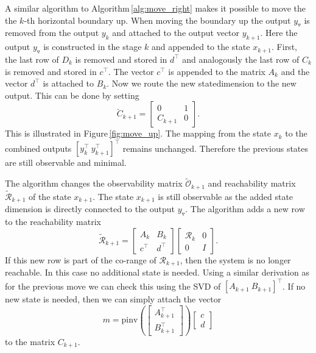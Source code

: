 \documentclass[numbers=noenddot,doctype=mastersthesis,BCOR=15mm,biblatex]{ldvbook}%
\newcommand{\R}{\mathcal{R}} %
\newcommand{\Ob}{\mathcal{O}} %
\newcommand{\eye}{I} %
\newcommand{\m}{\triangledown} %
\begin{document}
A similar algorithm to Algorithm\,\ref{alg:move_right} makes it possible to move the the $k$-th horizontal boundary up.
When moving the boundary up the output $y_\m$ is removed from the output $y_k$ and attached to the output vector $y_{k+1}$.
Here the output $y_\m$ is constructed in the stage $k$ and appended to the state $x_{k+1}$.
First, the last row of $D_{k}$ is removed and stored in $d^\top$ and analogously the last row of $C_k$ is removed and stored in $c^\top$.
The vector $c^\top$ is appended to the matrix $A_k$ and the vector $d^\top$ is attached to $B_k$.
Now we route the new statedimension to the new output.
This can be done by setting 
\begin{equation}
\breve{C}_{k+1} = 
\begin{bmatrix}
0 & 1\\ C_{k+1} & 0
\end{bmatrix}
.
\end{equation}
This is illustrated in Figure\,\ref{fig:move_up}.
The mapping from the state $x_k$ to the combined outputs $[y_k^\top \: y_{k+1}^\top]^\top$ remains unchanged. Therefore the previous states are still observable and minimal.

The algorithm changes the observability matrix $\tilde{\Ob}_{k+1}$ and reachability matrix $\tilde{\R}_{k+1}$ of the state $x_{k+1}$.
The state $x_{k+1}$ is still observable as the added state dimension is directly connected to the output $y_\m$.
The algorithm adds a new row to the reachability matrix
\begin{equation}
\tilde{\R}_{k+1}
=
\begin{bmatrix}
A_{k} & B_{k}\\
c^\top & d^\top
\end{bmatrix}
\begin{bmatrix}
\R_{k} &0\\
0& \eye
\end{bmatrix}
.
\end{equation}
If this new row is part of the co-range of $\R_{k+1}$, then the system is no longer reachable.
In this case no additional state is needed. 
Using a similar derivation as for the previous move we can check this using the SVD of $[A_{k+1} \: B_{k+1}]^\top$.
If no new state is needed, then we can simply attach the vector
\begin{equation}
m = \text{pinv}\left(\begin{bmatrix}
A_{k+1}^\top\\B_{k+1}^\top
\end{bmatrix}\right) 
\begin{bmatrix}
c \\ d
\end{bmatrix}
\end{equation}
to the matrix $C_{k+1}$.
\end{document}
